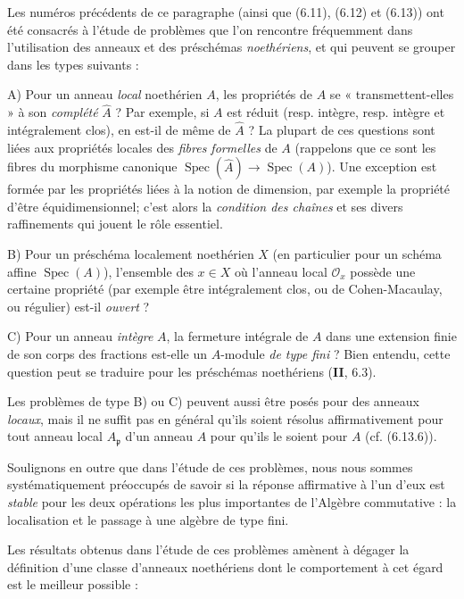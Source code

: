 \begin{env}[7.8.1]
\label{IV.2.s7.8.1-fr}
Les numéros précédents de ce paragraphe (ainsi que (6.11), (6.12) et (6.13))
ont été consacrés à l'étude de problèmes que l'on rencontre fréquemment dans
l'utilisation des anneaux et des préschémas \emph{noethériens}, et qui peuvent se
grouper dans les types suivants :

A) Pour un anneau \emph{local} noethérien $A$, les propriétés de $A$ se
« transmettent-elles » à son \emph{complété} $\widehat A$ ? Par exemple, si
$A$ est réduit (resp. intègre, resp. intègre et intégralement clos), en est-il
de même de $\widehat A$ ? La plupart de ces questions sont liées aux propriétés
locales des \emph{fibres formelles} de $A$ (rappelons que ce sont les fibres du
morphisme canonique
$\operatorname{Spec}(\widehat A)\to\operatorname{Spec}(A)$). Une exception est
formée par les propriétés liées à la notion de dimension, par exemple la
propriété d'être équidimensionnel; c'est alors la \emph{condition des chaînes}
et ses divers raffinements qui jouent le rôle essentiel.

B) Pour un préschéma localement noethérien $X$ (en particulier pour un schéma
affine $\operatorname{Spec}(A)$), l'ensemble des $x\in X$ où l'anneau local
$\mathcal O_x$ possède une certaine propriété (par exemple être intégralement
clos, ou de Cohen-Macaulay, ou régulier) est-il \emph{ouvert} ?

C) Pour un anneau \emph{intègre} $A$, la fermeture intégrale de $A$ dans une
extension finie de son corps des fractions est-elle un $A$-module \emph{de type
fini} ? Bien entendu, cette question peut se traduire pour les préschémas
noethériens (\textbf{II}, 6.3).

Les problèmes de type B) ou C) peuvent aussi être posés pour des anneaux
\emph{locaux}, mais il ne suffit pas en général qu'ils soient résolus
affirmativement pour tout anneau local $A_{\mathfrak p}$ d'un anneau $A$ pour
qu'ils le soient pour $A$ (cf. (6.13.6)).

Soulignons en outre que dans l'étude de ces problèmes, nous nous sommes
systématiquement préoccupés de savoir si la réponse affirmative à l'un d'eux
est \emph{stable} pour les deux opérations les plus importantes de l'Algèbre
commutative : la localisation et le passage à une algèbre de type fini.

Les résultats obtenus dans l'étude de ces problèmes amènent à dégager la
définition d'une classe d'anneaux noethériens dont le comportement à cet égard
est le meilleur possible :
\end{env}

